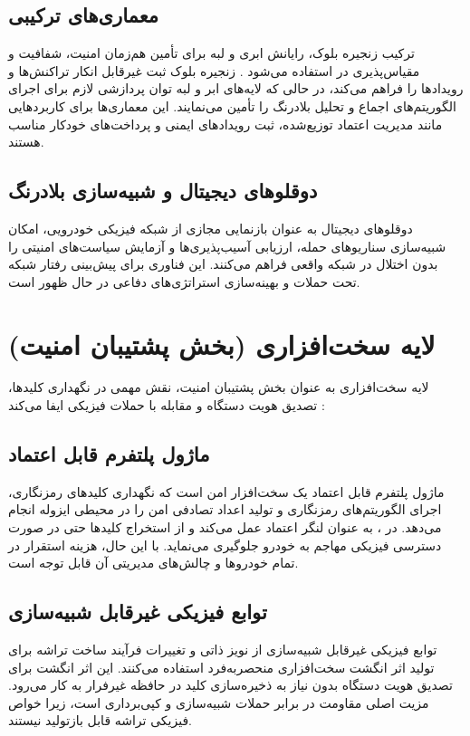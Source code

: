 \documentclass[12pt,a4paper]{article}
\begin{document}
\subsection{معماری‌های ترکیبی}
ترکیب زنجیره بلوک، رایانش ابری و لبه برای تأمین هم‌زمان امنیت، شفافیت و مقیاس‌پذیری در  استفاده می‌شود \cite{farsimadanReviewSecurityChallenges2025}. زنجیره بلوک ثبت غیرقابل انکار تراکنش‌ها و رویدادها را فراهم می‌کند، در حالی که لایه‌های ابر و لبه توان پردازشی لازم برای اجرای الگوریتم‌های اجماع و تحلیل بلادرنگ را تأمین می‌نمایند. این معماری‌ها برای کاربردهایی مانند مدیریت اعتماد توزیع‌شده، ثبت رویدادهای ایمنی و پرداخت‌های خودکار مناسب هستند.

\subsection{دوقلوهای دیجیتال و شبیه‌سازی بلادرنگ}
دوقلوهای دیجیتال به عنوان بازنمایی مجازی از شبکه فیزیکی خودرویی، امکان شبیه‌سازی سناریوهای حمله، ارزیابی آسیب‌پذیری‌ها و آزمایش سیاست‌های امنیتی را بدون اختلال در شبکه واقعی فراهم می‌کنند. این فناوری برای پیش‌بینی رفتار شبکه تحت حملات و بهینه‌سازی استراتژی‌های دفاعی در حال ظهور است.

\section{لایه سخت‌افزاری (بخش پشتیبان امنیت)}
لایه سخت‌افزاری به عنوان بخش پشتیبان امنیت، نقش مهمی در نگهداری کلیدها، تصدیق هویت دستگاه و مقابله با حملات فیزیکی ایفا می‌کند \cite{rahmawatiagustinaSystematicLiteratureReview2025}:

\subsection{ماژول پلتفرم قابل اعتماد}
ماژول پلتفرم قابل اعتماد یک سخت‌افزار امن است که نگهداری کلیدهای رمزنگاری، اجرای الگوریتم‌های رمزنگاری و تولید اعداد تصادفی امن را در محیطی ایزوله انجام می‌دهد. در ،  به عنوان لنگر اعتماد عمل می‌کند و از استخراج کلیدها حتی در صورت دسترسی فیزیکی مهاجم به خودرو جلوگیری می‌نماید. با این حال، هزینه استقرار  در تمام خودروها و چالش‌های مدیریتی آن قابل توجه است.

\subsection{توابع فیزیکی غیرقابل شبیه‌سازی}
توابع فیزیکی غیرقابل شبیه‌سازی از نویز ذاتی و تغییرات فرآیند ساخت تراشه برای تولید اثر انگشت سخت‌افزاری منحصربه‌فرد استفاده می‌کنند. این اثر انگشت برای تصدیق هویت دستگاه بدون نیاز به ذخیره‌سازی کلید در حافظه غیرفرار به کار می‌رود. مزیت اصلی  مقاومت در برابر حملات شبیه‌سازی و کپی‌برداری است، زیرا خواص فیزیکی تراشه قابل بازتولید نیستند.
\end{document}
